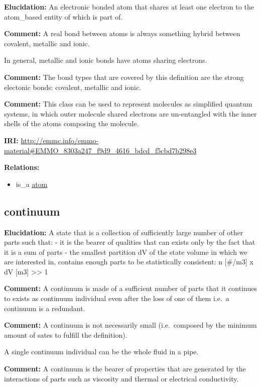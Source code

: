 \documentclass[a4paper,]{report}
\providecommand{\tightlist}{%
  \setlength{\itemsep}{0pt}\setlength{\parskip}{0pt}}
\begin{document}
\textbf{Elucidation:} An electronic bonded atom that shares at least one
electron to the atom\_based entity of which is part of.

\textbf{Comment:} A real bond between atoms is always something hybrid
between covalent, metallic and ionic.

In general, metallic and ionic bonds have atoms sharing electrons.

\textbf{Comment:} The bond types that are covered by this definition are
the strong electonic bonds: covalent, metallic and ionic.

\textbf{Comment:} This class can be used to represent molecules as
simplified quantum systems, in which outer molecule shared electrons are
un-entangled with the inner shells of the atoms composing the molecule.

\textbf{IRI:}
\url{http://emmc.info/emmo-material\#EMMO_8303a247_f9d9_4616_bdcd_f5cbd7b298e3}

\textbf{Relations:}

\begin{itemize}
\tightlist
\item
  is\_a \protect\hyperlink{atom}{atom}
\end{itemize}

\hypertarget{continuum}{%
\subsection{continuum}\label{continuum}}

\textbf{Elucidation:} A state that is a collection of sufficiently large
number of other parts such that: - it is the bearer of qualities that
can exists only by the fact that it is a sum of parts - the smallest
partition dV of the state volume in which we are interested in, contains
enough parts to be statistically consistent: n {[}\#/m3{]} x dV {[}m3{]}
\textgreater{}\textgreater{} 1

\textbf{Comment:} A continuum is made of a sufficient number of parts
that it continues to exists as continuum individual even after the loss
of one of them i.e.~a continuum is a redundant.

\textbf{Comment:} A continuum is not necessarily small (i.e.~composed by
the minimum amount of sates to fulfill the definition).

A single continuum individual can be the whole fluid in a pipe.

\textbf{Comment:} A continuum is the bearer of properties that are
generated by the interactions of parts such as viscosity and thermal or
electrical conductivity.
\end{document}
